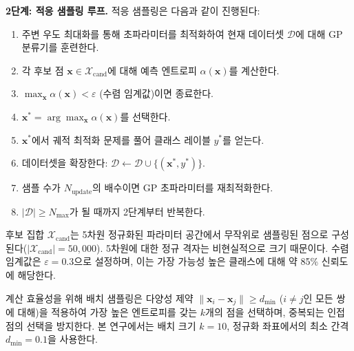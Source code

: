 \documentclass[a4paper,fleqn]{cas-dc}
\begin{document}
\textbf{2단계: 적응 샘플링 루프.} 적응 샘플링은 다음과 같이 진행된다:

\begin{enumerate}
\item 주변 우도 최대화를 통해 초파라미터를 최적화하여 현재 데이터셋 $\mathcal{D}$에 대해 GP 분류기를 훈련한다.

\item 각 후보 점 $\mathbf{x} \in \mathcal{X}_{\text{cand}}$에 대해 예측 엔트로피 $\alpha(\mathbf{x})$를 계산한다.

\item $\max_{\mathbf{x}} \alpha(\mathbf{x}) < \varepsilon$ (수렴 임계값)이면 종료한다.

\item $\mathbf{x}^* = \arg\max_{\mathbf{x}} \alpha(\mathbf{x})$를 선택한다.

\item $\mathbf{x}^*$에서 궤적 최적화 문제를 풀어 클래스 레이블 $y^*$를 얻는다.

\item 데이터셋을 확장한다: $\mathcal{D} \leftarrow \mathcal{D} \cup \{(\mathbf{x}^*, y^*)\}$.

\item 샘플 수가 $N_{\text{update}}$의 배수이면 GP 초파라미터를 재최적화한다.

\item $|\mathcal{D}| \geq N_{\max}$가 될 때까지 2단계부터 반복한다.
\end{enumerate}

후보 집합 $\mathcal{X}_{\text{cand}}$는 5차원 정규화된 파라미터 공간에서 무작위로 샘플링된 점으로 구성된다($|\mathcal{X}_{\text{cand}}| = 50{,}000$). 5차원에 대한 정규 격자는 비현실적으로 크기 때문이다. 수렴 임계값은 $\varepsilon = 0.3$으로 설정하며, 이는 가장 가능성 높은 클래스에 대해 약 85\% 신뢰도에 해당한다.

계산 효율성을 위해 배치 샘플링은 다양성 제약 $\|\mathbf{x}_i - \mathbf{x}_j\| \geq d_{\min}$ ($i \neq j$인 모든 쌍에 대해)을 적용하여 가장 높은 엔트로피를 갖는 $k$개의 점을 선택하며, 중복되는 인접 점의 선택을 방지한다. 본 연구에서는 배치 크기 $k = 10$, 정규화 좌표에서의 최소 간격 $d_{\min} = 0.1$을 사용한다.

\printcredits

%





\end{document}
